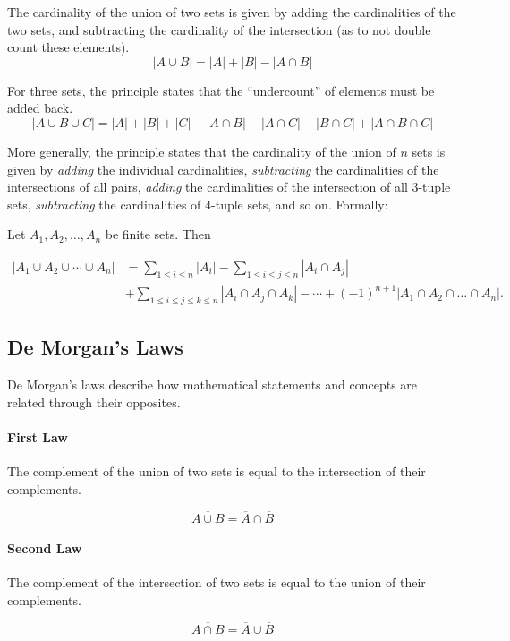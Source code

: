 The cardinality of the union of two sets is given by adding the cardinalities of the two sets, and subtracting the cardinality of the intersection (as to not double count these elements).
\[	| A \cup B | = |A| + |B| - |A \cap B| \tag{Principle of inclusion-exclusion}\]

For three sets, the principle states that the ``undercount'' of elements must be added back.
\[	
  |A \cup B \cup C| = |A| + |B| + |C| - |A \cap B| - |A \cap C| - |B \cap C| + |A \cap B \cap C|
\]

More generally, the principle states that the cardinality of the union of \( n \) sets is given by \emph{adding}  the individual cardinalities, \emph{subtracting}  the cardinalities of the intersections of all pairs, \emph{adding}  the cardinalities of the intersection of all 3-tuple sets, \emph{subtracting}  the cardinalities of 4-tuple sets, and so on. Formally:

Let \( A_1, A_2, \ldots, A_n \) be finite sets. Then

\begin{align*}
  |A_1 \cup A_2 \cup \cdots \cup A_n| &= \sum_{1 \leq i \leq n} |A_i| - \sum_{1 \leq i \leq j \leq n} |A_i \cap A_j| \\ &+ \sum_{1 \leq i \leq j \leq k \leq n} |A_i \cap A_j \cap A_k| - \cdots + {(-1)}^{n+1} |A_1 \cap A_2 \cap \ldots \cap A_n|.
\end{align*}


\subsection{De Morgan's Laws}
De Morgan's laws describe how mathematical statements and concepts are related through their opposites.
\paragraph*{First Law} The complement of the union of two sets is equal to the intersection of their complements.

\[
\overline{A \cup B} = \overline{A} \cap \overline{B}
\]
\paragraph{Second Law} The complement of the intersection of two sets is equal to the union of their complements.

\[
	\overline{A \cap B} = \overline{A} \cup \overline{B}
\]

